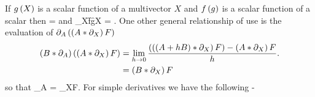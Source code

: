 If ${g}\left ( {X} \right )$ is a scalar function of a multivector $X$ and ${f}\left ( {g} \right )$ is a scalar function of a scalar then
\be
	 = 
\ee
and
\be
	\partial_{X}\f{f}{\f{g}{X}} = .
\ee
One other general relationship of use is the evaluation of $\partial_{A}\left ( {\left ( {A*\partial_{X}} \right ) F} \right )$
\begin{align}
	\left ( {B*\partial_{A}} \right )\left ( {\left ( {A*\partial_{X}} \right ) F} \right ) &= \lim_{h\rightarrow 0}\displaystyle\frac{\left ( {\left ( {\left ( {A+hB} \right )*\partial_{X}} \right ) F} \right )-\left ( {A*\partial_{X}} \right ) F}{h}.\nonumber \\
	                                                      &= \left ( {B*\partial_{X}} \right ) F \label{eq6_40}                            
\end{align}
so that
\be
	 \partial_{A} = \partial_{X}F.\label{eq6_40a}
\ee
For simple derivatives we have the following -
